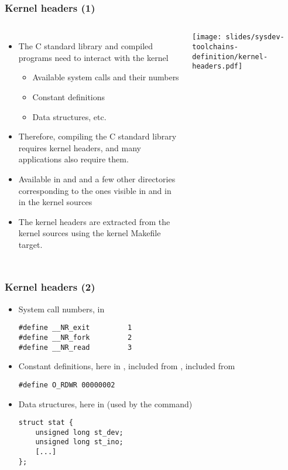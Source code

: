 \begin{frame}
  \frametitle{Kernel headers (1)}
  \begin{columns}[T]
    \begin{itemize}
    \item The C standard library and compiled programs need to interact with the kernel
      \begin{itemize}
      \item Available system calls and their numbers
      \item Constant definitions
      \item Data structures, etc.
      \end{itemize}
    \item Therefore, compiling the C standard library requires kernel headers, and many
      applications also require them.
    \item Available in  and  and a few
      other directories corresponding to the ones visible in
       and in  in the kernel sources
    \item The kernel headers are extracted from the kernel sources using
      the  kernel Makefile target.
    \end{itemize}
    \texttt{[image: slides/sysdev-toolchains-definition/kernel-headers.pdf]}
  \end{columns}
\end{frame}

\begin{frame}[fragile]
  \frametitle{Kernel headers (2)}
  \begin{itemize}
  \item System call numbers, in 
\begin{verbatim}
#define __NR_exit         1
#define __NR_fork         2
#define __NR_read         3
\end{verbatim}
  \item Constant definitions, here in ,
    included from , included from
\begin{verbatim}
#define O_RDWR 00000002
\end{verbatim}
\item Data structures, here in  (used by the
 command)
\begin{verbatim}
struct stat {
    unsigned long st_dev;
    unsigned long st_ino;
    [...]
};
\end{verbatim}
\end{itemize}
\end{frame}

